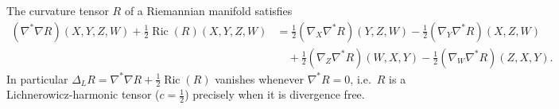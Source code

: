 \begin{theorem}[Theorem 9.4.2]
  \label{thm:pet-ch9-curvature-tensor-lichnerowicz}
  The curvature tensor $R$ of a Riemannian manifold satisfies
  \begin{align*}
    (\nabla^*\nabla R)(X,Y,Z,W)+\tfrac12\operatorname{Ric}(R)(X,Y,Z,W)
    &=\tfrac12(\nabla_X\nabla^*R)(Y,Z,W)-\tfrac12(\nabla_Y\nabla^*R)(X,Z,W)\\
    &\quad+\tfrac12(\nabla_Z\nabla^*R)(W,X,Y)-\tfrac12(\nabla_W\nabla^*R)(Z,X,Y).
  \end{align*}
  In particular $\Delta_LR=\nabla^*\nabla R+\tfrac12\operatorname{Ric}(R)$ vanishes whenever
  $\nabla^*R=0$, i.e.\ $R$ is a Lichnerowicz-harmonic tensor ($c=\tfrac12$)
  precisely when it is divergence free.
\end{theorem}
